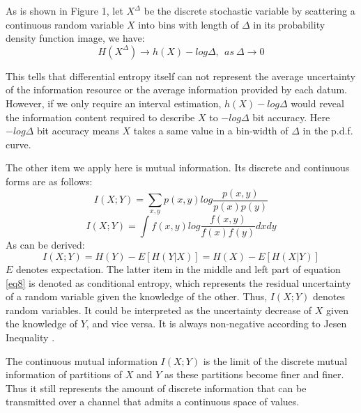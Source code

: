 As is shown in Figure 1, let $X^\Delta$ be the discrete 
stochastic variable by scattering a continuous random 
variable $X$ into bins with length of $\Delta$ in its 
probability density function image, we have:
\begin{equation}\label{correct}
H(X^\Delta)\to h(X)-log\Delta,~~as ~\Delta \to 0
\end{equation}
\iffalse
\begin{figure}[H]
\centering
\texttt{[image: Quantization.png]}
\caption{Quantization of a Continuous Random Variable}%
\cite{cover2012elements}}
\end{figure}
\fi
This tells that differential entropy itself can not 
represent the average uncertainty of the information 
resource or the average information provided by each datum. 
However, if we only require an interval estimation, $h(X)-
log\Delta $ would reveal the information content required 
to describe $X$ to $ -log\Delta$ bit accuracy\cite
{cover2012elements}.  Here $ -log\Delta$ bit accuracy means 
$X$ takes a same value in a bin-width of $\Delta$ in the 
p.d.f. curve. 

The other item we apply here is mutual information. Its 
discrete and continuous forms are as follows:
\begin{equation}
I(X;Y)=\sum_{x,y}p(x,y)log\frac{p(x,y)}{p(x)p(y)}
\end{equation}
\begin{equation}
I(X;Y)=\int f(x,y)log\frac{f(x,y)}{f(x)f(y)}dxdy
\end{equation}
As can be derived:
\begin{equation}\label{eq8}
I(X;Y)=H(Y)-E[H(Y|X)]=H(X)-E[H(X|Y)]
\end{equation}
$E$ denotes expectation. The latter item in the middle and 
left part of equation \eqref{eq8} is denoted as conditional 
entropy, which represents the residual uncertainty of a 
random variable given the knowledge of the other. Thus,
$I(X;Y)$ denotes %
random variables. It could be interpreted as 
the uncertainty decrease of $X$ given the knowledge of $Y$, 
and vice versa. It is always non-negative according to  
Jesen Inequality \cite{cover2012elements}.

The continuous mutual information $I(X;Y)$ is the limit of 
the discrete mutual information of partitions of $X$ and 
$Y$ as these partitions become finer and finer. Thus it  
still represents the amount of discrete information that 
can be transmitted over a channel that admits a continuous 
space of values.

